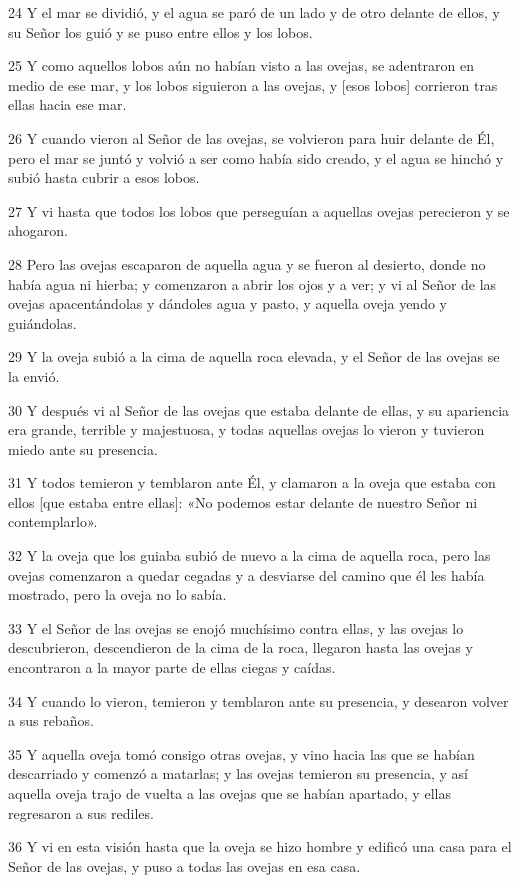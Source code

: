 \par 24 Y el mar se dividió, y el agua se paró de un lado y de otro delante de ellos, y su Señor los guió y se puso entre ellos y los lobos.
\par 25 Y como aquellos lobos aún no habían visto a las ovejas, se adentraron en medio de ese mar, y los lobos siguieron a las ovejas, y [esos lobos] corrieron tras ellas hacia ese mar.
\par 26 Y cuando vieron al Señor de las ovejas, se volvieron para huir delante de Él, pero el mar se juntó y volvió a ser como había sido creado, y el agua se hinchó y subió hasta cubrir a esos lobos.
\par 27 Y vi hasta que todos los lobos que perseguían a aquellas ovejas perecieron y se ahogaron.
\par 28 Pero las ovejas escaparon de aquella agua y se fueron al desierto, donde no había agua ni hierba; y comenzaron a abrir los ojos y a ver; y vi al Señor de las ovejas apacentándolas y dándoles agua y pasto, y aquella oveja yendo y guiándolas.
\par 29 Y la oveja subió a la cima de aquella roca elevada, y el Señor de las ovejas se la envió.
\par 30 Y después vi al Señor de las ovejas que estaba delante de ellas, y su apariencia era grande, terrible y majestuosa, y todas aquellas ovejas lo vieron y tuvieron miedo ante su presencia.
\par 31 Y todos temieron y temblaron ante Él, y clamaron a la oveja que estaba con ellos [que estaba entre ellas]: «No podemos estar delante de nuestro Señor ni contemplarlo».
\par 32 Y la oveja que los guiaba subió de nuevo a la cima de aquella roca, pero las ovejas comenzaron a quedar cegadas y a desviarse del camino que él les había mostrado, pero la oveja no lo sabía.
\par 33 Y el Señor de las ovejas se enojó muchísimo contra ellas, y las ovejas lo descubrieron, descendieron de la cima de la roca, llegaron hasta las ovejas y encontraron a la mayor parte de ellas ciegas y caídas.
\par 34 Y cuando lo vieron, temieron y temblaron ante su presencia, y desearon volver a sus rebaños.
\par 35 Y aquella oveja tomó consigo otras ovejas, y vino hacia las que se habían descarriado y comenzó a matarlas; y las ovejas temieron su presencia, y así aquella oveja trajo de vuelta a las ovejas que se habían apartado, y ellas regresaron a sus rediles.
\par 36 Y vi en esta visión hasta que la oveja se hizo hombre y edificó una casa para el Señor de las ovejas, y puso a todas las ovejas en esa casa.

